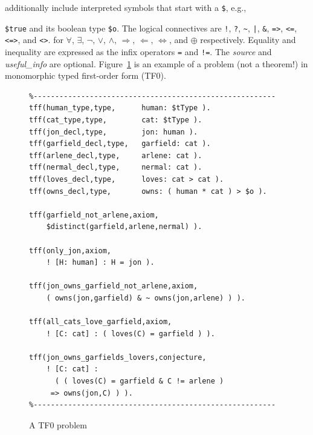 \documentclass[letterpaper]{article}
\newcommand{\smalltt}[1]{\small \texttt{#1}}
\begin{document}
additionally include interpreted symbols that start with a {\tt \$}, e.g., {\smalltt{\$true} and
its boolean type {\smalltt{\$o}}.
The logical connectives are
{\tt !}, {\tt ?}, {\tt \verb|~|}, {\tt |}, {\tt \&}, {\tt =>}, {\tt <=}, {\tt <=>}, and 
{\tt <{\raisebox{0.4ex}{\texttildelow}}>}.
for
$\forall$, $\exists$, $\neg$, $\vee$, $\wedge$, $\Rightarrow$, $\Leftarrow$, $\Leftrightarrow$, 
and $\oplus$ respectively.
Equality and inequality are expressed as the infix operators {\tt =} and {\tt !=}.
The {\em source} and {\em useful\_info} are optional.
Figure~\ref{TF0FiniteProblem} is an example of a problem (not a theorem!) in monomorphic 
typed first-order form (TF0).  

\begin{figure}[htbp]
\scriptsize
{}
\begin{verbatim}
%--------------------------------------------------------
tff(human_type,type,      human: $tType ).
tff(cat_type,type,        cat: $tType ).
tff(jon_decl,type,        jon: human ).
tff(garfield_decl,type,   garfield: cat ).
tff(arlene_decl,type,     arlene: cat ).
tff(nermal_decl,type,     nermal: cat ).
tff(loves_decl,type,      loves: cat > cat ).
tff(owns_decl,type,       owns: ( human * cat ) > $o ).

tff(garfield_not_arlene,axiom,
    $distinct(garfield,arlene,nermal) ).

tff(only_jon,axiom,
    ! [H: human] : H = jon ).

tff(jon_owns_garfield_not_arlene,axiom,
    ( owns(jon,garfield) & ~ owns(jon,arlene) ) ).

tff(all_cats_love_garfield,axiom,
    ! [C: cat] : ( loves(C) = garfield ) ).

tff(jon_owns_garfields_lovers,conjecture,
    ! [C: cat] :
      ( ( loves(C) = garfield & C != arlene ) 
     => owns(jon,C) ) ).
%--------------------------------------------------------
\end{verbatim}
\caption{A TF0 problem
}
\label{TF0FiniteProblem}
\end{figure}

}
\end{document}
